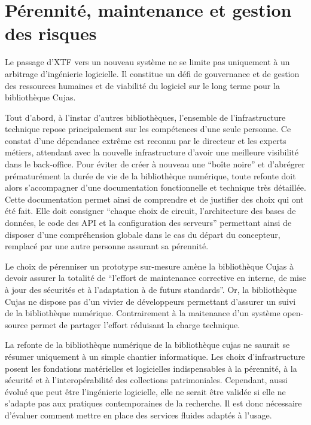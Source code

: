 \section{Pérennité, maintenance et gestion des risques}
Le passage d'XTF vers un nouveau système ne se limite pas uniquement à un arbitrage d'ingénierie logicielle. Il constitue un défi de gouvernance et de gestion des ressources humaines et de viabilité du logiciel sur le long terme pour la bibliothèque Cujas.

Tout d'abord, à l'instar d'autres bibliothèques, l'ensemble de l'infrastructure technique repose principalement sur les compétences d'une seule personne. Ce constat d'une dépendance extrême est reconnu par le directeur et les experts métiers, attendant avec la nouvelle infrastructure d'avoir une meilleure visibilité dans le back-office. Pour éviter de créer à nouveau une \enquote{boîte noire} et d'abrégrer prématurément la durée de vie de la bibliothèque numérique, toute refonte doit alors s'accompagner d'une documentation fonctionnelle et technique très détaillée. Cette documentation permet ainsi de comprendre et de justifier des choix qui ont été fait. Elle doit consigner \enquote{chaque choix de circuit, l'architecture des bases de données, le code des API et la configuration des serveurs} permettant ainsi de disposer d'une compréhension globale dans le cas du départ du concepteur, remplacé par une autre personne assurant sa pérennité.
	
Le choix de pérenniser un prototype sur-mesure amène la bibliothèque Cujas à devoir assurer la totalité de \enquote{l'effort de maintenance corrective en interne, de mise à jour des sécurités et à l'adaptation à de futurs standards}. Or, la bibliothèque Cujas ne dispose pas d'un vivier de développeurs permettant d'assurer un suivi de la bibliothèque numérique. Contrairement à la maitenance d'un système open-source permet de partager l'effort réduisant la charge technique.

La refonte de la bibliothèque numérique de la bibliothèque cujas ne saurait se résumer uniquement à un simple chantier informatique. Les choix d'infrastructure posent les fondations matérielles et logicielles indispensables à la pérennité, à la sécurité et à l'interopérabilité des collections patrimoniales. Cependant, aussi évolué que peut être l'ingénierie logicielle, elle ne serait être validée si elle ne s'adapte pas aux pratiques contemporaines de la recherche. Il est donc nécessaire d'évaluer comment mettre en place des services fluides adaptés à l'usage.